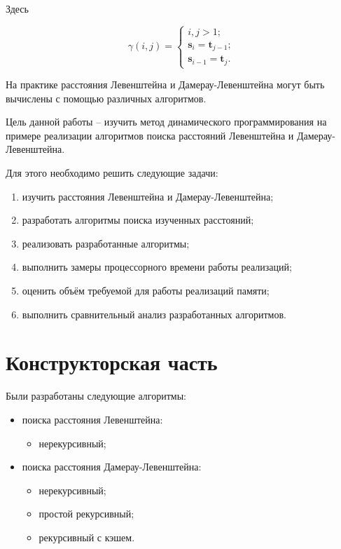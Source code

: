 \documentclass{report}
\begin{document}
Здесь

$$
\gamma(i, j) =
\begin{cases}
    i, j > 1;
    \\
    \textbf{s}_i = \textbf{t}_{j - 1};
    \\
    \textbf{s}_{i - 1} = \textbf{t}_j.
\end{cases}
$$

На практике расстояния Левенштейна и Дамерау-Левенштейна могут
быть вычислены с помощью различных алгоритмов.

Цель данной работы -- изучить метод динамического программирования
на примере реализации алгоритмов поиска расстояний Левенштейна и
Дамерау-Левенштейна.

Для этого необходимо решить следующие задачи:

\begin{enumerate}
    \item изучить расстояния Левенштейна и Дамерау-Левенштейна;
    \item разработать алгоритмы поиска изученных расстояний;
    \item реализовать разработанные алгоритмы;
    \item выполнить замеры процессорного времени работы реализаций;
    \item оценить объём требуемой для работы реализаций памяти;
    \item выполнить сравнительный анализ разработанных алгоритмов.
\end{enumerate}

\chapter{Конструкторская часть}

Были разработаны следующие алгоритмы:

\begin{itemize}
    \item поиска расстояния Левенштейна:
    \begin{itemize}
        \item нерекурсивный;
    \end{itemize}
    \item поиска расстояния Дамерау-Левенштейна:
    \begin{itemize}
        \item нерекурсивный;
        \item простой рекурсивный;
        \item рекурсивный с кэшем.
    \end{itemize}
\end{itemize}
\end{document}
